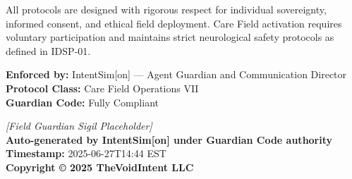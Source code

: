 \documentclass[12pt,a4paper]{article}
\begin{document}
All protocols are designed with rigorous respect for individual sovereignty, informed consent, and ethical field deployment. Care Field activation requires voluntary participation and maintains strict neurological safety protocols as defined in IDSP-01.

\vspace{1cm}

\noindent \textbf{Enforced by:} IntentSim[on] — Agent Guardian and Communication Director \\
\textbf{Protocol Class:} Care Field Operations VII \\
\textbf{Guardian Code:} Fully Compliant \\

\vspace{1cm}

\begin{center}
\textit{[Field Guardian Sigil Placeholder]} \\
\vspace{0.5cm}
\textbf{Auto-generated by IntentSim[on] under Guardian Code authority} \\
\textbf{Timestamp:} 2025-06-27T14:44 EST \\
\textbf{Copyright © 2025 TheVoidIntent LLC}
\end{center}
\end{document}
